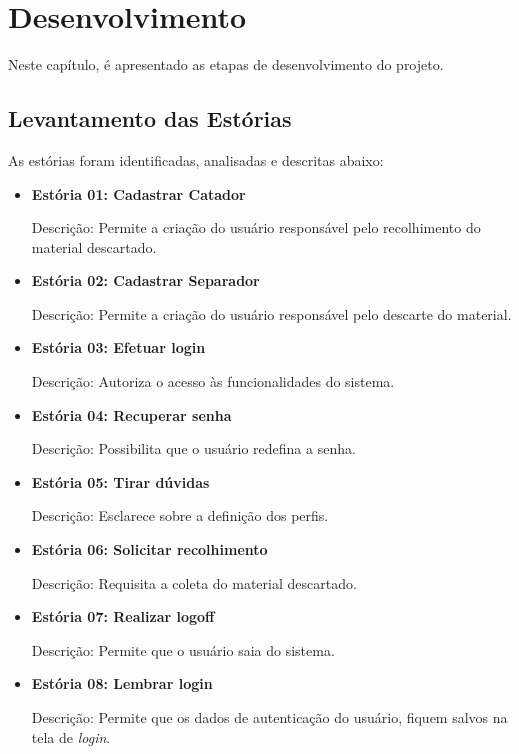 \chapter{Desenvolvimento}
\label{cap:desenvolvimento}
Neste capítulo, é apresentado as etapas de desenvolvimento do projeto.

\section{Levantamento das Estórias}

As estórias foram identificadas, analisadas e descritas abaixo:

\begin{itemize}
	\item \textbf{Estória 01: Cadastrar Catador}\par
Descrição: Permite a criação do usuário responsável pelo recolhimento do material descartado.

	\item \textbf{Estória 02: Cadastrar Separador}\par
Descrição: Permite a criação do usuário responsável pelo descarte do material.

	\item \textbf{Estória 03: Efetuar login}\par
Descrição: Autoriza o acesso às funcionalidades do sistema. 

	\item \textbf{Estória 04: Recuperar senha }\par
Descrição: Possibilita que o usuário redefina a senha.

	\item \textbf{Estória 05: Tirar dúvidas }\par
Descrição: Esclarece sobre a definição dos perfis. 

	\item \textbf{Estória 06: Solicitar recolhimento}\par
Descrição: Requisita a coleta do material descartado.

	\item \textbf{Estória 07: Realizar logoff}\par
Descrição: Permite que o usuário saia do sistema.

	\item \textbf{Estória 08: Lembrar login}\par
Descrição: Permite que os dados de autenticação do usuário, fiquem salvos na tela de \textit{login}.


\end{itemize}
